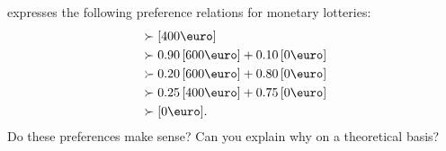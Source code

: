 \documentclass{../ape}
\begin{document}
\section{}
\TAtwo{} expresses the following preference relations for monetary lotteries:
\begin{align*}
	[600\text{\euro}] & \succ [400\text{\euro}] \\
							 			& \succ 0.90 \, [600\text{\euro}] + 0.10 \, [0\text{\euro}] \\
							 			& \succ 0.20 \, [600\text{\euro}] + 0.80 \, [0\text{\euro}] \\
							 			& \succ 0.25 \, [400\text{\euro}] + 0.75 \, [0\text{\euro}] \\
							 			& \succ [0\text{\euro}].
\end{align*}
Do these preferences make sense? Can you explain why on a theoretical basis?
\end{document}
